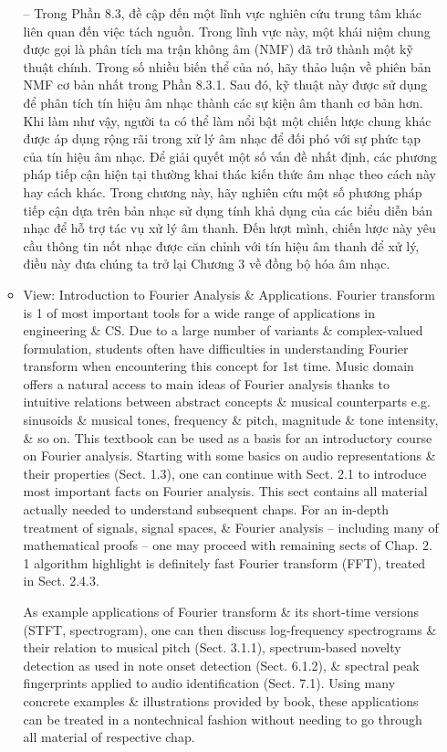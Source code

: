 \documentclass{article}
\begin{document}
\begin{itemize}
\begin{itemize}
		-- 	Trong Phần 8.3, đề cập đến một lĩnh vực nghiên cứu trung tâm khác liên quan đến việc tách nguồn. Trong lĩnh vực này, một khái niệm chung được gọi là phân tích ma trận không âm (NMF) đã trở thành một kỹ thuật chính. Trong số nhiều biến thể của nó, hãy thảo luận về phiên bản NMF cơ bản nhất trong Phần 8.3.1. Sau đó, kỹ thuật này được sử dụng để phân tích tín hiệu âm nhạc thành các sự kiện âm thanh cơ bản hơn. Khi làm như vậy, người ta có thể làm nổi bật một chiến lược chung khác được áp dụng rộng rãi trong xử lý âm nhạc để đối phó với sự phức tạp của tín hiệu âm nhạc. Để giải quyết một số vấn đề nhất định, các phương pháp tiếp cận hiện tại thường khai thác kiến thức âm nhạc theo cách này hay cách khác. Trong chương này, hãy nghiên cứu một số phương pháp tiếp cận dựa trên bản nhạc sử dụng tính khả dụng của các biểu diễn bản nhạc để hỗ trợ tác vụ xử lý âm thanh. Đến lượt mình, chiến lược này yêu cầu thông tin nốt nhạc được căn chỉnh với tín hiệu âm thanh để xử lý, điều này đưa chúng ta trở lại Chương 3 về đồng bộ hóa âm nhạc.	
		\item {\sf View: Introduction to Fourier Analysis \& Applications.} Fourier transform is 1 of most important tools for a wide range of applications in engineering \& CS. Due to a large number of variants \& complex-valued formulation, students often have difficulties in understanding Fourier transform when encountering this concept for 1st time. Music domain offers a natural access to main ideas of Fourier analysis thanks to intuitive relations between abstract concepts \& musical counterparts e.g. sinusoids \& musical tones, frequency \& pitch, magnitude \& tone intensity, \& so on. This textbook can be used as a basis for an introductory course on Fourier analysis. Starting with some basics on audio representations \& their properties (Sect. 1.3), one can continue with Sect. 2.1 to introduce most important facts on Fourier analysis. This sect contains all material actually needed to understand subsequent chaps. For an in-depth treatment of signals, signal spaces, \& Fourier analysis -- including many of mathematical proofs -- one may proceed with remaining sects of Chap. 2. 1 algorithm highlight is definitely fast Fourier transform (FFT), treated in Sect. 2.4.3.
		
		As example applications of Fourier transform \& its short-time versions (STFT, spectrogram), one can then discuss log-frequency spectrograms \& their relation to musical pitch (Sect. 3.1.1), spectrum-based novelty detection as used in note onset detection (Sect. 6.1.2), \& spectral peak fingerprints applied to audio identification (Sect. 7.1). Using many concrete examples \& illustrations provided by book, these applications can be treated in a nontechnical fashion without needing to go through all material of respective chap.
		

\end{itemize}
\end{itemize}
\end{document}
